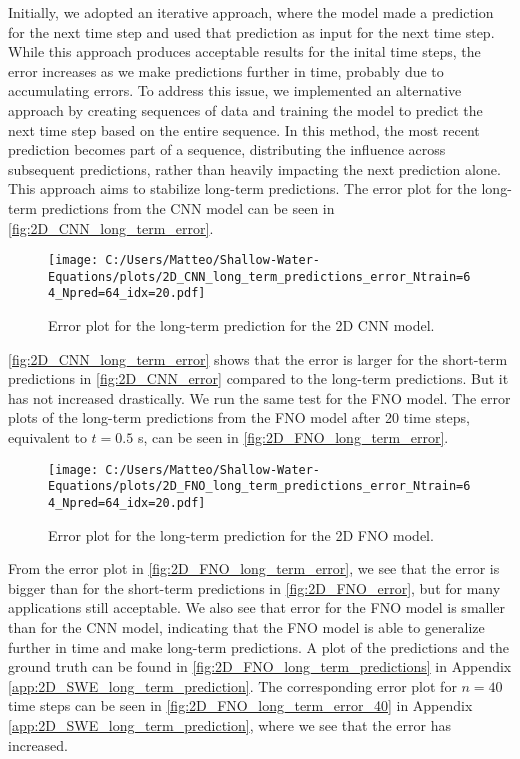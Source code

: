 Initially, we adopted an iterative approach, where the model made a prediction for the next time step and used that prediction as input for the next time step.
While this approach produces acceptable results for the inital time steps, the error increases as we make predictions further in time, probably due to accumulating errors.
To address this issue, we implemented an alternative approach by creating sequences of data and training the model to predict the next time step based on the entire sequence.
In this method, the most recent prediction becomes part of a sequence, distributing the influence across subsequent predictions, rather than heavily impacting the next prediction alone.
This approach aims to stabilize long-term predictions.
The error plot for the long-term predictions from the CNN model can be seen in \autoref{fig:2D_CNN_long_term_error}.
\begin{figure}[H]
    \centering
    \texttt{[image: C:/Users/Matteo/Shallow-Water-Equations/plots/2D\_CNN\_long\_term\_predictions\_error\_Ntrain=64\_Npred=64\_idx=20.pdf]}
    \caption{Error plot for the long-term prediction for the 2D CNN model.}\label{fig:2D_CNN_long_term_error}
\end{figure}
\autoref{fig:2D_CNN_long_term_error} shows that the error is larger for the short-term predictions in \autoref{fig:2D_CNN_error} compared to the long-term predictions.
But it has not increased drastically.
We run the same test for the FNO model.
The error plots of the long-term predictions from the FNO model after 20 time steps, equivalent to $t = 0.5$ s, can be seen in \autoref{fig:2D_FNO_long_term_error}.
\begin{figure}[H]
    \centering
    \texttt{[image: C:/Users/Matteo/Shallow-Water-Equations/plots/2D\_FNO\_long\_term\_predictions\_error\_Ntrain=64\_Npred=64\_idx=20.pdf]}
    \caption{Error plot for the long-term prediction for the 2D FNO model.}\label{fig:2D_FNO_long_term_error}
\end{figure}
From the error plot in \autoref{fig:2D_FNO_long_term_error}, we see that the error is bigger than for the short-term predictions in \autoref{fig:2D_FNO_error}, but for many applications still acceptable.
We also see that error for the FNO model is smaller than for the CNN model, indicating that the FNO model is able to generalize further in time and make long-term predictions.
A plot of the predictions and the ground truth can be found in \autoref{fig:2D_FNO_long_term_predictions} in Appendix \autoref{app:2D_SWE_long_term_prediction}.
The corresponding error plot for $n = 40$ time steps can be seen in \autoref{fig:2D_FNO_long_term_error_40} in Appendix \autoref{app:2D_SWE_long_term_prediction}, where we see that the error has increased.

